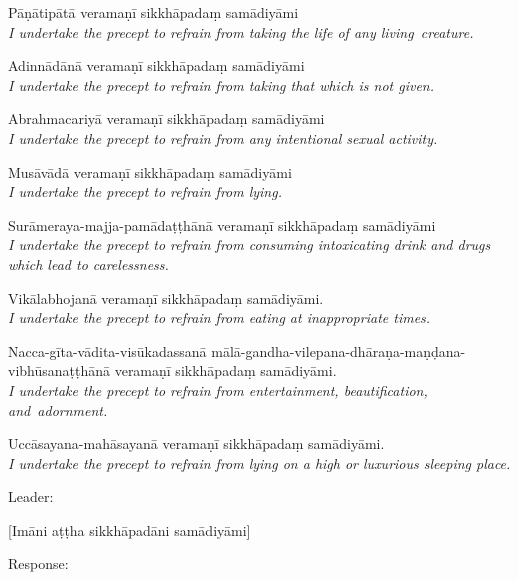{\raggedright

\begin{packedenumerate}
  \item Pāṇātipātā veramaṇī sikkhāpadaṃ samādiyāmi\\
  \emph{I undertake the precept to refrain from taking the life of any living~creature.}
  \item Adinnādānā veramaṇī sikkhāpadaṃ samādiyāmi\\
  \emph{I undertake the precept to refrain from taking that which is not given.}
  \item Abrahmacariyā veramaṇī sikkhāpadaṃ samādiyāmi\\
  \emph{I undertake the precept to refrain from any intentional sexual activity.}
  \item Musāvādā veramaṇī sikkhāpadaṃ samādiyāmi\\
  \emph{I undertake the precept to refrain from lying.}
  \item Surāmeraya-majja-pamādaṭṭhānā veramaṇī sikkhāpadaṃ samādiyāmi\\
  \emph{I undertake the precept to refrain from consuming intoxicating drink and drugs which lead to carelessness.}
  \item Vikālabhojanā veramaṇī sikkhāpadaṃ samādiyāmi.\\
  \emph{I undertake the precept to refrain from eating at inappropriate times.}
  \item Nacca-gīta-vādita-visūkadassanā mālā-gandha-vilepana-dhāraṇa-maṇḍana-vibhūsanaṭṭhānā veramaṇī sikkhāpadaṃ samādiyāmi.\\
  \emph{I undertake the precept to refrain from entertainment, beautification, and~adornment.}
  \item Uccāsayana-mahāsayanā veramaṇī sikkhāpadaṃ samādiyāmi.\\
  \emph{I undertake the precept to refrain from lying on a high or luxurious sleeping place.}
\end{packedenumerate}

}


\begin{instruction}
  Leader:
\end{instruction}

[Imāni aṭṭha sikkhāpadāni samādiyāmi]

\begin{instruction}
  Response:
\end{instruction}

